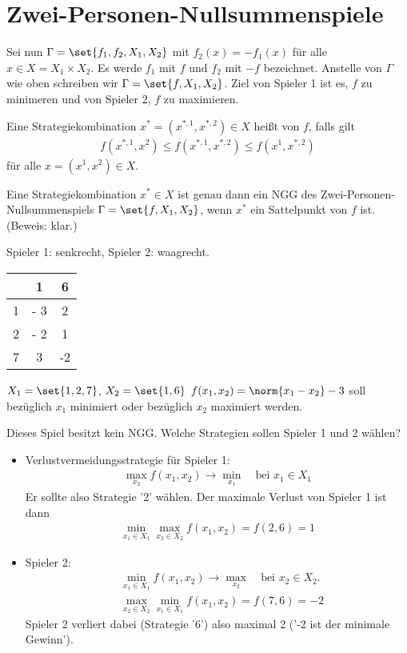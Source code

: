 \section{Zwei-Personen-Nullsummenspiele}
Sei nun $\Gamma = \set{f_{1}, f_{2}, X_{1}, X_{2}}$ mit $f_{2}(x) = -f_{1}(x)$ für alle $x \in X = X_{1} \times X_{2}$. Es werde $f_{1}$ mit $f$ und $f_{2}$ mit $-f$ bezeichnet. Anstelle von $\Gamma$ wie oben schreiben wir $\Gamma = \set{f, X_{1}, X_{2}}$. Ziel von Spieler 1 ist es, $f$ zu minimeren und von Spieler 2, $f$ zu maximieren.   
\begin{definition*}
  Eine Strategiekombination $x^{*} = (x^{*, 1}, x^{*, 2}) \in X $ heißt  von $f$, falls gilt
  \begin{align*}
    f(x^{*, 1}, x^{2}) \leq f(x^{*, 1}, x^{*, 2}) \leq f(x^{1}, x^{*, 2})
  \end{align*}
für alle $x=(x^{1}, x^{2}) \in X$.  
\end{definition*}
\begin{satz}\label{thm:NGG_saddlepoint}
  Eine Strategiekombination $x^{*} \in X$ ist genau dann ein NGG des Zwei-Personen-Nullsummenspiels $\Gamma = \set{f, X_{1}, X_{2}}$, wenn $x^{*}$ ein Sattelpunkt von $f$ ist. (Beweis: klar.)
\end{satz}
\begin{beispiel} Spieler 1: senkrecht, Spieler 2: waagrecht. 

  \begin{tabular}[h!]{l|c c}
    &1 & 6 \\\hline
    1 & - 3 & 2\\
    2 & - 2 & 1\\
    7 & 3 & -2\\
  \end{tabular}

$X_{1} = \set {1, 2, 7}$, $X_{2} = \set{1, 6}$ $f (x_{1}, x_{2}) = \norm{x_{1} - x_{2}} -3$ soll bezüglich $x_{1}$ minimiert oder bezüglich $x_{2}$ maximiert werden.

Dieses Spiel besitzt kein NGG. Welche Strategien sollen Spieler 1 und 2 wählen?
\begin{itemize}
\item Verlustvermeidungsstrategie für Spieler 1:
  \begin{align*}
    \max_{x_{2}} f(x_{1}, x_{2}) \to \min_{x_{1}} \quad \text{bei } x_{1} \in X_{1}
  \end{align*}
Er sollte also Strategie '2' wählen. Der maximale Verlust von Spieler 1 ist dann
\begin{align*}
  \min_{x_{1} \in X_{1}}\max_{x_{2} \in X_{2}} f(x_{1}, x_{2}) = f(2, 6) = 1
\end{align*}
\item Spieler 2:
  \begin{align*}
    &\min_{x_{1} \in X_{1}} f(x_{1}, x_{2}) \to \max_{x_{2}} \quad \text{bei }x_{2} \in X_{2}. \\
    &\max_{x_{2} \in X_{2}}\min_{x_{1} \in X_{1}} f(x_{1}, x_{2}) = f(7, 6) = -2
  \end{align*}
Spieler 2 verliert dabei (Strategie '6') also maximal 2 ('-2 ist der minimale Gewinn').
\end{itemize}
\end{beispiel}
